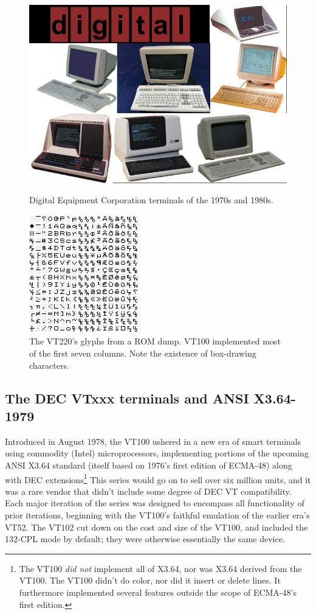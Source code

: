 \documentclass[letterpaper,10pt]{article}
\begin{document}
\begin{appendices}
\begin{figure}
  \begin{minipage}{0.5\textwidth}
  \centering
    \includegraphics[width=.5\linewidth]{media/digital-terms.jpeg}
    \caption{Digital Equipment Corporation terminals of the 1970s and 1980s.}
  \end{minipage}\hfill
  \begin{minipage}{0.4\textwidth}
  \centering
    \includegraphics[width=.45\linewidth]{media/vt220-charset.png}
    \caption[VT220 glyph dump.]{The VT220's glyphs from a ROM dump. VT100 implemented most of the
      first seven columns. Note the existence of box-drawing characters\cite{crttypography}.}
  \end{minipage}\hfill
\end{figure}

\subsection{The DEC VTxxx terminals and ANSI X3.64-1979}

Introduced in August 1978, the VT100 ushered in a new era of smart terminals
using commodity (Intel) microprocessors, implementing portions of the upcoming
ANSI X3.64 standard (itself based on 1976's first edition of ECMA-48) along
with DEC extensions\footnote{The VT100 \textit{did not} implement all of X3.64,
nor was X3.64 derived from the VT100. The VT100 didn't do color, nor did it
insert or delete lines. It furthermore implemented several features outside
the scope of ECMA-48's first edition.} This series would go on to sell over
six million units, and it was a rare vendor that didn't include some degree
of DEC VT compatibility. Each major iteration of the series was designed to
encompass all functionality of prior iterations, beginning with the VT100's
faithful emulation of the earlier era's VT52. The VT102 cut down on the cost
and size of the VT100, and included the 132-CPL mode by default; they were
otherwise essentially the same device\cite{vt100}.


\end{appendices}
\end{document}
